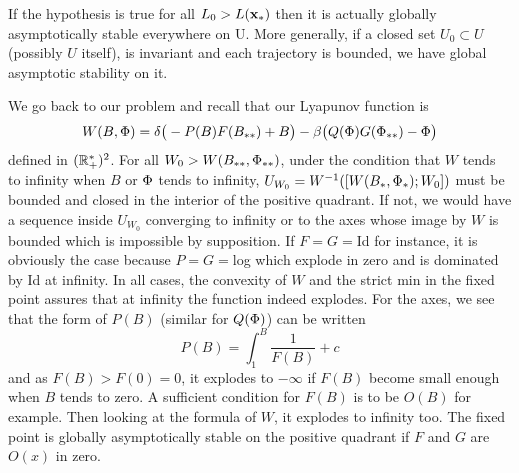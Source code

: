 \begin{remarque}
If the hypothesis is true for all $L_0>L(\xx_*)$ then it is actually globally asymptotically stable everywhere on U. More generally, if a closed set $U_0\subset U$ (possibly $U$ itself), is invariant and each trajectory is bounded, we have global asymptotic stability on it.
\end{remarque}
We go back to our problem and recall that our Lyapunov function is 
\[W(B,\P) = \d \big(-P(B)F(\Bstar) + B\big) 
-\b\big(Q(\P) G(\Pstar)-\P\big)\]
defined in $(\R^*_+)^2$. For all $W_0>W(\Bstar,\Pstar)$, under the condition that $W$ tends to infinity when $B$ or $\P$ tends to infinity, $U_{W_0}=W^{-1}([W(B_*,\P_*);W_0])$ must be bounded and closed in the interior of the positive quadrant. If not, we would have a sequence inside $U_{W_0}$ converging to infinity or to the axes whose image by $W$ is bounded which is impossible by supposition. If $F=G=$Id for instance, it is obviously the case because $P=G=$log which explode in zero and is dominated by Id at infinity. In all cases, the convexity of $W$ and the strict min in the fixed point assures that at infinity the function indeed explodes. For the axes, we see that the form of $P(B)$ (similar for $Q(\P)$) can be written
$$P(B) 
= \int_{1}^B\frac{1}{F(B)}+c$$
and as $F(B)>F(0)=0$, it explodes to $-\infty$ if $F(B)$ become small enough when $B$ tends to zero. A sufficient condition for $F(B)$ is to be $O(B)$ for example. Then looking at the formula of $W$, it explodes to infinity too. The fixed point is globally asymptotically stable on the positive quadrant if $F$ and $G$ are $O(x)$ in zero.